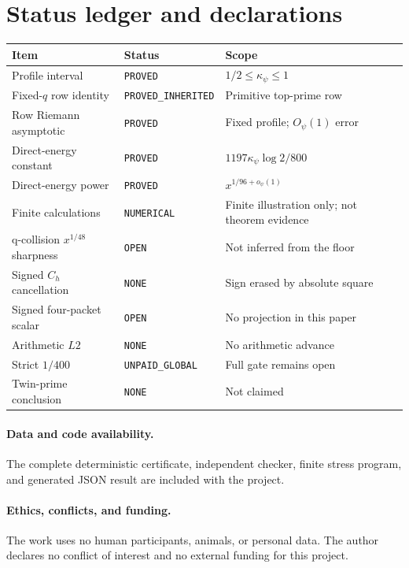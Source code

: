 \section{Status ledger and declarations}
\label{app:ledger}

\begin{center}
\small
\begin{tabular}{@{}p{}p{}p{}@{}}
\toprule
Item & Status & Scope \\
\midrule
Profile interval & \texttt{PROVED} & $1/2\leq\kappa_\psi\leq1$ \\
Fixed-$q$ row identity & \texttt{PROVED\_INHERITED} & Primitive top-prime row \\
Row Riemann asymptotic & \texttt{PROVED} & Fixed profile; $O_\psi(1)$ error \\
Direct-energy constant & \texttt{PROVED} & $1197\kappa_\psi\log2/800$ \\
Direct-energy power & \texttt{PROVED} & $x^{1/96+o_\psi(1)}$ \\
Finite calculations & \texttt{NUMERICAL} & Finite illustration only; not theorem evidence \\
q-collision $x^{1/48}$ sharpness & \texttt{OPEN} & Not inferred from the floor \\
Signed $C_h$ cancellation & \texttt{NONE} & Sign erased by absolute square \\
Signed four-packet scalar & \texttt{OPEN} & No projection in this paper \\
Arithmetic $L2$ & \texttt{NONE} & No arithmetic advance \\
Strict $1/400$ & \texttt{UNPAID\_GLOBAL} & Full gate remains open \\
Twin-prime conclusion & \texttt{NONE} & Not claimed \\
\bottomrule
\end{tabular}
\end{center}

\paragraph{Data and code availability.}
The complete deterministic certificate, independent checker, finite stress
program, and generated JSON result are included with the project.

\paragraph{Ethics, conflicts, and funding.}
The work uses no human participants, animals, or personal data.  The author
declares no conflict of interest and no external funding for this project.

